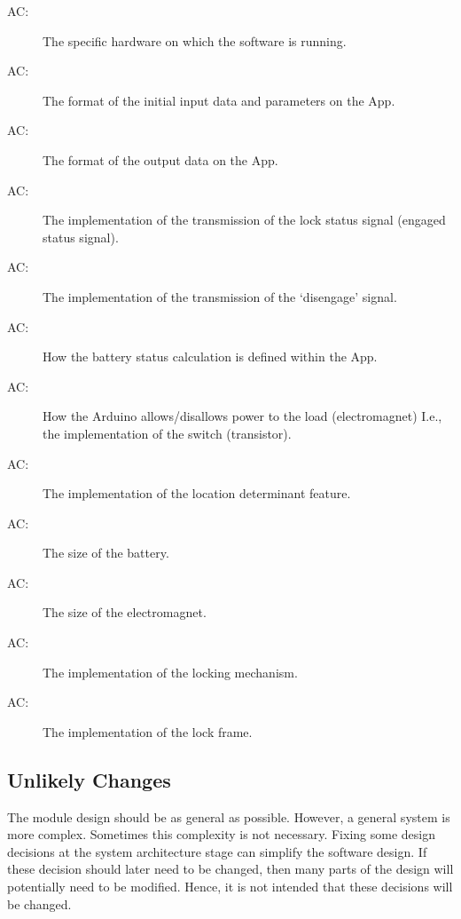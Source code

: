 \documentclass[12pt, titlepage]{article}
\newcounter{acnum}
\newcommand{\actheacnum}{AC\theacnum}
\begin{document}
\begin{description}
\item[ \actheacnum \label{acHardware}:]  The specific hardware on which the software is running. 
\item[\actheacnum\label{acInput}:] The format of the initial input data and parameters on the App. 
\item[\actheacnum\label{acOutput}:] The format of the output data on the App. 
\item[\actheacnum\label{acEngage}:] The implementation of the transmission of the lock status signal (engaged status signal). 
\item[\actheacnum\label{acWireless}:] The implementation of the transmission of the ‘disengage’ signal. 
\item[\actheacnum\label{acBatteryStatus}:] How the battery status calculation is defined within the App. 
\item[\actheacnum\label{acPowerSignal}:] How the Arduino allows/disallows power to the load (electromagnet) I.e., the implementation of the switch (transistor). 
\item[\actheacnum\label{acGeocaching}:] The implementation of the location determinant feature. 
\item[\actheacnum\label{acBattery}:] The size of the battery. 
\item[\actheacnum\label{acMagnet}:] The size of the electromagnet. 
\item[\actheacnum\label{acLockingMechanism}:] The implementation of the locking mechanism. 
\item[\actheacnum\label{acLockFrame}:] The implementation of the lock frame. 

\end{description}

\subsection{Unlikely Changes} \label{SecUchange}

The module design should be as general as possible. However, a general system is
more complex. Sometimes this complexity is not necessary. Fixing some design
decisions at the system architecture stage can simplify the software design. If
these decision should later need to be changed, then many parts of the design
will potentially need to be modified. Hence, it is not intended that these
decisions will be changed.
\end{document}

